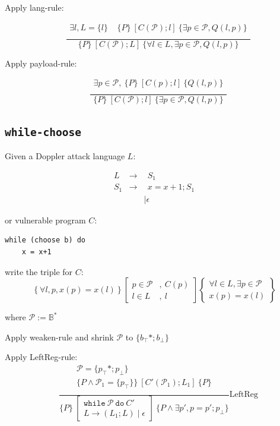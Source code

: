 \documentclass[12pt]{article}
\begin{document}
Apply lang-rule:

\[
\quad
\frac{
\begin{array}{c}
 \exists l , L = \{l\}~~~~
~\{ P \} \ [C(\mathcal{P}) ; l] \ \{ \exists p \in \mathcal{P}, Q(l,p)\} \\
\end{array}
}{
\{ P \} \ [ C(\mathcal{P}); L] \ \{ \forall l \in L, \exists p \in \mathcal{P}, Q(l,p) \}
}
\]

Apply payload-rule:

\[
\quad
\frac{
\begin{array}{c}
\exists p \in \mathcal{P},~\{ P \} \ [C(p) ; l] \ \{ Q(l,p)\} \\
\end{array}
}{
\{ P \} \ [ C(\mathcal{P}); l] \ \{ \exists p \in \mathcal{P}, Q(l,p) \}
}
\]

\subsection{\texttt{while-choose}}
Given a Doppler attack language $L$:

\[
\begin{array}{rrl}
     L & \rightarrow & ~~S_1 \\
     S_1 & \rightarrow & ~~x=x+1;S_1 \\
     &  & \mid \epsilon
\end{array}
\]

or vulnerable program $C$:
\begin{lstlisting}
while (choose b) do
    x = x+1
\end{lstlisting}

write the triple for $C$: 
\[
\left\{ \forall l, p, x(p) = x(l) \right\}
\left[
\begin{array}{ll}
p \in \mathcal{P} & , ~C(p) \\
l \in L & , ~l
\end{array}
\right]
\left\{
\begin{array}{c}
\forall l \in L , \exists p \in \mathcal{P} \\
x(p) = x(l)
\end{array}
\right\}
\]

where $\mathcal{P} := \mathbb{B}^*$

Apply weaken-rule and shrink $\mathcal{P}$ to $\{b_\top*;b_\bot\}$

Apply LeftReg-rule:
\[
\quad
\frac{
\begin{array}{c}
 \mathcal{P} = \{p_\top*;p_\bot\}\\
\{ P \wedge \mathcal{P}_1=\{p_\top\}\} \ [C'(\mathcal{P}_1) ; L_1] \ \{ P\} \\
\end{array}
}{
\{ P \} \ \left[ 
\begin{array}{c}
     \texttt{while} ~\mathcal{P}~\texttt{do}~C'  \\
     L\rightarrow (L_1;L)\mid \epsilon
\end{array}\right] \ 
\{ P \wedge \exists p', p =p';p_\bot \}
}
{\text{LeftReg}}
\]
\end{document}
